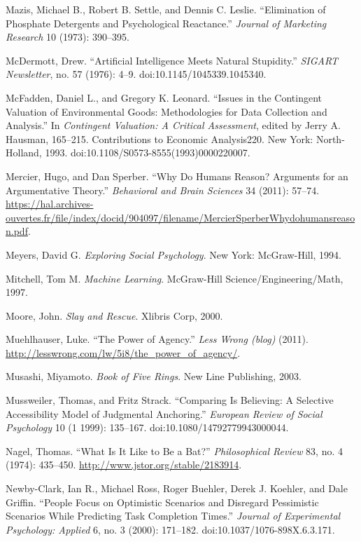 \documentclass[letterpaper]{book}
\begin{document}
{
 Mazis, Michael B., Robert B. Settle, and Dennis C. Leslie.
``Elimination of Phosphate Detergents and
Psychological Reactance.'' \textit{Journal of
Marketing Research} 10 (1973): 390--395.}

{
 McDermott, Drew. ``Artificial Intelligence Meets
Natural Stupidity.'' \textit{SIGART Newsletter}, no.
57 (1976): 4--9. doi:10.1145/1045339.1045340.}

{
 McFadden, Daniel L., and Gregory K. Leonard.
``Issues in the Contingent Valuation of Environmental
Goods: Methodologies for Data Collection and
Analysis.'' In \textit{Contingent Valuation: A
Critical Assessment}, edited by Jerry A. Hausman, 165--215.
Contributions to Economic Analysis220. New York: North-Holland, 1993.
doi:10.1108/S0573-8555(1993)0000220007.}

{
 Mercier, Hugo, and Dan Sperber. ``Why Do Humans
Reason? Arguments for an Argumentative Theory.''
\textit{Behavioral and Brain Sciences} 34 (2011): 57--74.
\url{https://hal.archives-ouvertes.fr/file/index/docid/904097/filename/MercierSperberWhydohumansreason.pdf}.}

{
 Meyers, David G. \textit{Exploring Social Psychology}. New York:
McGraw-Hill, 1994.}

{
 Mitchell, Tom M. \textit{Machine Learning}. McGraw-Hill
Science/Engineering/Math, 1997.}

{
 Moore, John. \textit{Slay and Rescue}. Xlibris Corp, 2000.}

{
 Muehlhauser, Luke. ``The Power of
Agency.'' \textit{Less Wrong (blog)} (2011).
\url{http://lesswrong.com/lw/5i8/the\_power\_of\_agency/}.}

{
 Musashi, Miyamoto. \textit{Book of Five Rings}. New Line
Publishing, 2003.}

{
 Mussweiler, Thomas, and Fritz Strack. ``Comparing
Is Believing: A Selective Accessibility Model of Judgmental
Anchoring.'' \textit{European Review of Social
Psychology} 10 (1 1999): 135--167. doi:10.1080/14792779943000044.}

{
 Nagel, Thomas. ``What Is It Like to Be a
Bat?'' \textit{Philosophical Review} 83, no. 4
(1974): 435--450. \url{http://www.jstor.org/stable/2183914}.}

{
 Newby-Clark, Ian R., Michael Ross, Roger Buehler, Derek J.
Koehler, and Dale Griffin. ``People Focus on
Optimistic Scenarios and Disregard Pessimistic Scenarios While
Predicting Task Completion Times.'' \textit{Journal
of Experimental Psychology: Applied} 6, no. 3 (2000): 171--182.
doi:10.1037/1076-898X.6.3.171.}
\end{document}
